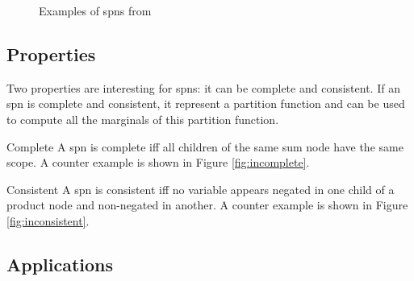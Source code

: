 \begin{figure}[!ht]
\begin{mdframed}
	
	
	\caption{Examples of \glspl{spn} from \cite{spns}}
	\label{fig:spn_example}
\end{mdframed}
\end{figure}

\subsection{Properties}

Two properties are interesting for \glspl{spn}: it can be complete and consistent. If an \gls{spn} is complete and consistent, it represent a partition function and can be used to compute all the marginals of this partition function.

\begin{definition}{Complete}
A \gls{spn} is complete iff all children of the same sum node have the same scope. A counter example is shown in Figure \ref{fig:incomplete}.
\end{definition}

\begin{definition}{Consistent}
A \gls{spn} is consistent iff no variable appears negated in one child of a product node and non-negated in another. A counter example is shown in Figure \ref{fig:inconsistent}.
\end{definition}

\begin{figure}[!ht]
\begin{mdframed}
	\centering
	\subfloat[incomplete]{ \label{fig:incomplete}}
	\subfloat[inconsistent]{ \label{fig:inconsistent}}
\end{mdframed}
\end{figure}

\subsection{Applications}

